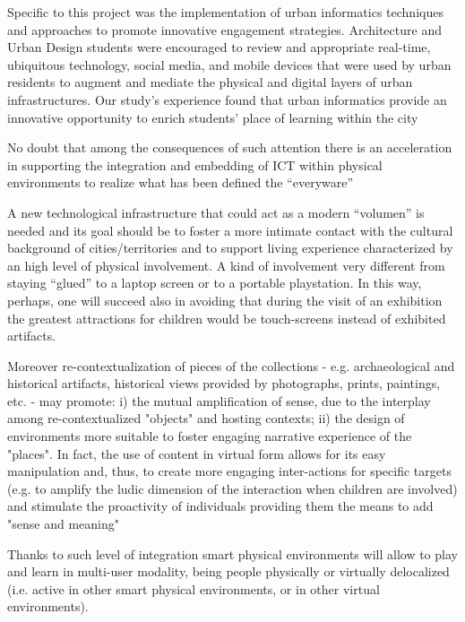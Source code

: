 
Specific to this project was the implementation of urban informatics techniques and approaches to promote innovative engagement strategies. Architecture and Urban Design students were encouraged to review and appropriate real-time, ubiquitous technology, social media, and mobile devices that were used by urban residents to augment and mediate the physical and digital layers of urban infrastructures. Our study’s experience found that urban informatics provide an innovative opportunity to enrich students’ place of learning within the city\cite{amayocaldwell_urban_2013}

No doubt that among the consequences of such attention there is an acceleration in supporting the integration and embedding of ICT within physical environments to realize what has been defined
the ``everyware''\cite{giffinger_smart_2007}

A new technological infrastructure that could act as a modern ``volumen'' is needed and its goal should be to foster a more intimate contact with the cultural background of cities/territories and to support living experience characterized by an high level of physical involvement. A kind of involvement very different from staying ``glued'' to a laptop screen or to a portable playstation. In this way, perhaps, one will succeed also in avoiding that during the visit of an exhibition the greatest attractions for children would be touch-screens instead of exhibited artifacts.\cite{giovannella_scenarios_2013}


Moreover re-contextualization of pieces of the collections - e.g. archaeological and historical artifacts, historical views provided by photographs, prints, paintings, etc. - may promote: i) the mutual amplification of sense, due to the interplay among re-contextualized "objects" and hosting contexts; ii)
the design of environments more suitable to foster engaging narrative experience of the "places". In fact, the use of content in virtual form allows for its easy manipulation and, thus, to create more engaging inter-actions for specific targets (e.g. to amplify the ludic dimension\cite{greenfield_everyware_2010} of the interaction when children are involved) and stimulate the proactivity of individuals providing them the means to add "sense and meaning"\cite{giovannella_scenarios_2013}

Thanks to such level of integration smart physical environments will allow to play and learn in multi-user modality, being people physically or virtually delocalized (i.e. active in other smart physical environments, or in other virtual environments).\cite{giovannella_scenarios_2013}

